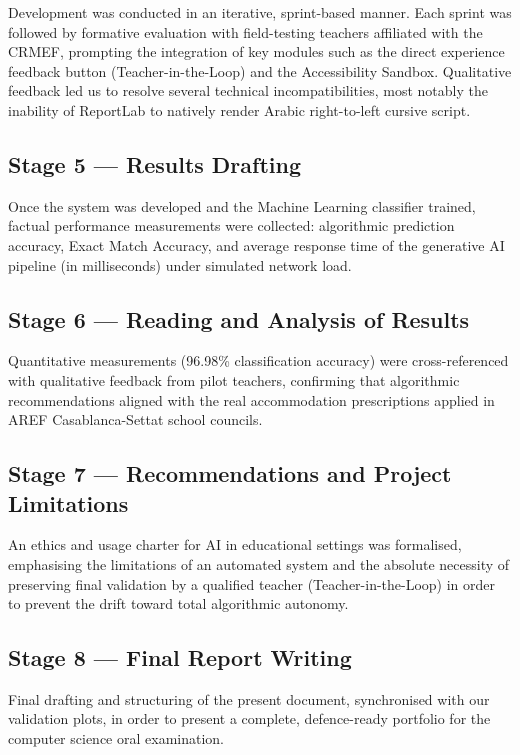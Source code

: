 \documentclass[12pt,a4paper]{report}
\begin{document}
Development was conducted in an iterative, sprint-based manner. Each sprint was followed by formative evaluation with field-testing teachers affiliated with the CRMEF, prompting the integration of key modules such as the direct experience feedback button (Teacher-in-the-Loop) and the Accessibility Sandbox. Qualitative feedback led us to resolve several technical incompatibilities, most notably the inability of ReportLab to natively render Arabic right-to-left cursive script.

\subsection{Stage 5 — Results Drafting}

Once the system was developed and the Machine Learning classifier trained, factual performance measurements were collected: algorithmic prediction accuracy, Exact Match Accuracy, and average response time of the generative AI pipeline (in milliseconds) under simulated network load.

\subsection{Stage 6 — Reading and Analysis of Results}

Quantitative measurements (96.98\% classification accuracy) were cross-referenced with qualitative feedback from pilot teachers, confirming that algorithmic recommendations aligned with the real accommodation prescriptions applied in AREF Casablanca-Settat school councils.

\subsection{Stage 7 — Recommendations and Project Limitations}

An ethics and usage charter for AI in educational settings was formalised, emphasising the limitations of an automated system and the absolute necessity of preserving final validation by a qualified teacher (Teacher-in-the-Loop) in order to prevent the drift toward total algorithmic autonomy.

\subsection{Stage 8 — Final Report Writing}

Final drafting and structuring of the present document, synchronised with our validation plots, in order to present a complete, defence-ready portfolio for the computer science oral examination.
\end{document}
